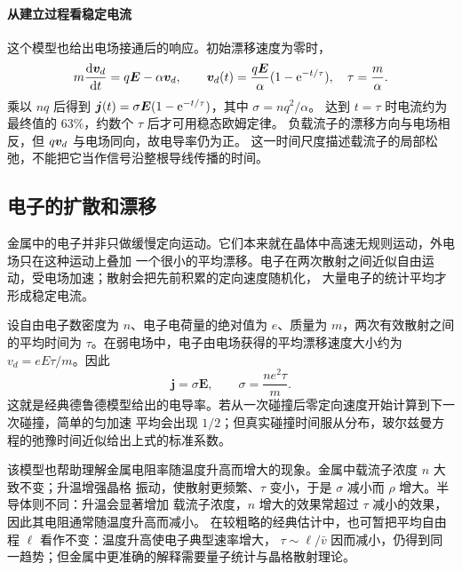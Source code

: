 {%

\paragraph{从建立过程看稳定电流}
这个模型也给出电场接通后的响应。初始漂移速度为零时，
\[
 m\frac{\mathop{}\!\mathrm d\bm{v}_d}{\mathop{}\!\mathrm d t}=q\bm{E}-\alpha\bm{v}_d,
 \qquad \bm{v}_d(t)=\frac{q\bm{E}}{\alpha}(1-\mathrm e^{-t/\tau}),\quad \tau=\frac m\alpha.
\]
乘以 $nq$ 后得到 $\bm{j}(t)=\sigma\bm{E}(1-\mathrm e^{-t/\tau})$，其中 $\sigma=nq^2/\alpha$。
达到 $t=\tau$ 时电流约为最终值的 $63\%$，约数个 $\tau$ 后才可用稳态欧姆定律。
负载流子的漂移方向与电场相反，但 $q\bm{v}_d$ 与电场同向，故电导率仍为正。
这一时间尺度描述载流子的局部松弛，不能把它当作信号沿整根导线传播的时间。


\subsection{电子的扩散和漂移}


金属中的电子并非只做缓慢定向运动。它们本来就在晶体中高速无规则运动，外电场只在这种运动上叠加
一个很小的平均漂移。电子在两次散射之间近似自由运动，受电场加速；散射会把先前积累的定向速度随机化，
大量电子的统计平均才形成稳定电流。

\par\noindent\begin{minipage}{\linewidth}
\drudeFigure
{}
\end{minipage}\par\medskip

设自由电子数密度为 $n$、电子电荷量的绝对值为 $e$、质量为 $m$，两次有效散射之间的平均时间为
$\tau$。在弱电场中，电子由电场获得的平均漂移速度大小约为 $v_d=eE\tau/m$。因此
\begin{equation}
  \boxed{\boldsymbol j=\sigma\boldsymbol E,\qquad
  \sigma=\frac{ne^2\tau}{m}}.
\end{equation}
这就是经典德鲁德模型给出的电导率。若从一次碰撞后零定向速度开始计算到下一次碰撞，简单的匀加速
平均会出现 $1/2$；但真实碰撞时间服从分布，玻尔兹曼方程的弛豫时间近似给出上式的标准系数。

该模型也帮助理解金属电阻率随温度升高而增大的现象。金属中载流子浓度 $n$ 大致不变；升温增强晶格
振动，使散射更频繁、$\tau$ 变小，于是 $\sigma$ 减小而 $\rho$ 增大。半导体则不同：升温会显著增加
载流子浓度，$n$ 增大的效果常超过 $\tau$ 减小的效果，因此其电阻通常随温度升高而减小。
在较粗略的经典估计中，也可暂把平均自由程 $\ell$ 看作不变：温度升高使电子典型速率增大，
$\tau\sim\ell/\bar v$ 因而减小，仍得到同一趋势；但金属中更准确的解释需要量子统计与晶格散射理论。

}
